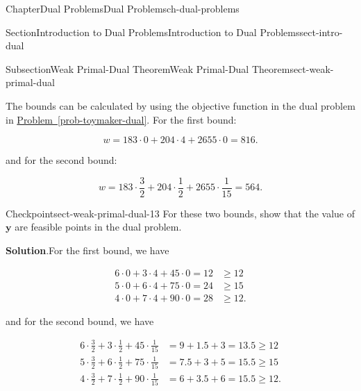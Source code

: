 \documentclass[oneside,10pt,]{book}
\newcommand{\blocktitlefont}{\relax}
\newcommand{\xreffont}{\relax}
\numberwithin{equation}{section}
\newcommand{\amp}{&}
\begin{document}
\begin{chapterptx}{Chapter}{Dual Problems}{}{Dual Problems}{}{}{ch-dual-problems}
\begin{sectionptx}{Section}{Introduction to Dual Problems}{}{Introduction to Dual Problems}{}{}{sect-intro-dual}
\begin{subsectionptx}{Subsection}{Weak Primal-Dual Theorem}{}{Weak Primal-Dual Theorem}{}{}{sect-weak-primal-dual}
\par
The bounds can be calculated by using the objective function in the dual problem in \hyperref[prob-toymaker-dual]{Problem~{\xreffont\ref{prob-toymaker-dual}}}. For the first bound:%
\par
%
\begin{equation*}
w = 183 \cdot 0 + 204 \cdot 4 + 2655 \cdot 0 = 816.
\end{equation*}
%
\par
and for the second bound:%
\par
%
\begin{equation*}
w = 183 \cdot \frac{3}{2} + 204 \cdot \frac{1}{2} + 2655 \cdot \frac{1}{15} = 564.
\end{equation*}
%
\begin{inlineexercise}{Checkpoint}{}{sect-weak-primal-dual-13}%
For these two bounds, show that the value of \(\boldsymbol{y}\) are feasible points in the dual problem.%
\par\smallskip%
\noindent\textbf{\blocktitlefont Solution}.\hypertarget{sect-weak-primal-dual-13-2}{}\quad{}For the first bound, we have%
\par
%
\begin{equation*}
\begin{aligned} 6 \cdot 0 + 3 \cdot 4 + 45 \cdot 0 = 12 \amp \geq 12 \\ 5 \cdot 0 + 6 \cdot 4 + 75 \cdot 0 = 24 \amp \geq 15 \\ 4 \cdot 0 + 7 \cdot 4 + 90 \cdot 0 = 28 \amp \geq 12.
\end{aligned}
\end{equation*}
%
\par
and for the second bound, we have%
\par
%
\begin{equation*}
\begin{aligned} 6 \cdot \frac{3}{2} + 3 \cdot \frac{1}{2} + 45 \cdot \frac{1}{15} \amp = 9 + 1.5 + 3 = 13.5 \geq 12 \\
5 \cdot \frac{3}{2} + 6 \cdot \frac{1}{2} + 75 \cdot \frac{1}{15} \amp = 7.5 + 3 + 5 =  15.5 \geq 15 \\
4 \cdot \frac{3}{2} + 7 \cdot \frac{1}{2} + 90 \cdot \frac{1}{15} \amp = 6 + 3.5 + 6 = 15.5 \geq 12.
\end{aligned}
\end{equation*}
%
\end{inlineexercise}%
\end{subsectionptx}
\end{sectionptx}
%
%
\typeout{************************************************}

\end{chapterptx}
\end{document}
